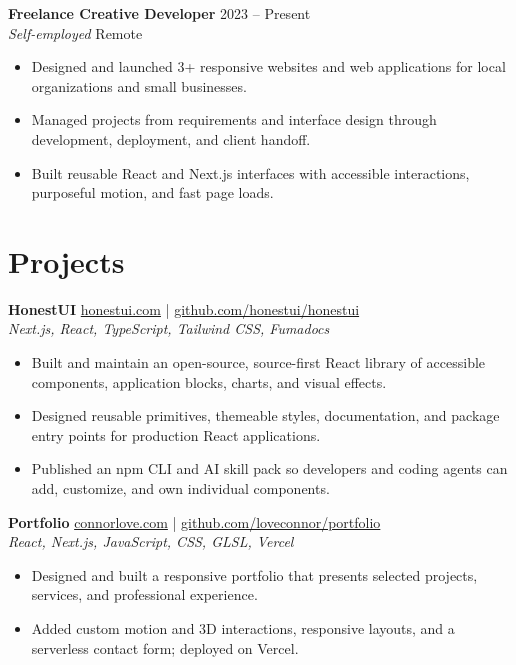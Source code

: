\documentclass[10pt]{article}
\begin{document}
\textbf{Freelance Creative Developer} \hfill 2023 -- Present\\
\textit{Self-employed} \hfill Remote
\begin{itemize}
  \item Designed and launched 3+ responsive websites and web applications for local organizations and small businesses.
  \item Managed projects from requirements and interface design through development, deployment, and client handoff.
  \item Built reusable React and Next.js interfaces with accessible interactions, purposeful motion, and fast page loads.
\end{itemize}

\section*{Projects}
\textbf{HonestUI} \hfill \href{https://honestui.com}{honestui.com} \;|\; \href{https://github.com/honestui/honestui}{github.com/honestui/honestui}\\
\textit{Next.js, React, TypeScript, Tailwind CSS, Fumadocs}
\begin{itemize}
  \item Built and maintain an open-source, source-first React library of accessible components, application blocks, charts, and visual effects.
  \item Designed reusable primitives, themeable styles, documentation, and package entry points for production React applications.
  \item Published an npm CLI and AI skill pack so developers and coding agents can add, customize, and own individual components.
\end{itemize}

\textbf{Portfolio} \hfill \href{https://www.connorlove.com}{connorlove.com} \;|\; \href{https://github.com/loveconnor/portfolio}{github.com/loveconnor/portfolio}\\
\textit{React, Next.js, JavaScript, CSS, GLSL, Vercel}
\begin{itemize}
  \item Designed and built a responsive portfolio that presents selected projects, services, and professional experience.
  \item Added custom motion and 3D interactions, responsive layouts, and a serverless contact form; deployed on Vercel.
\end{itemize}
\end{document}
